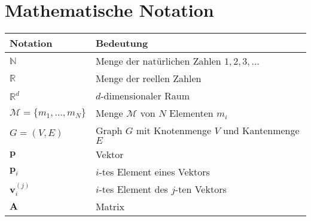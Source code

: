 
\chapter*{Mathematische Notation} \label{Notation}

\newcommand{\tabdummy}{\midrule[0pt]}

\begin{tabular}{p{}p{}}
  \textbf{Notation} & \textbf{Bedeutung} \\ \toprule[1pt]
   $\mathbb{N}$ & Menge der natürlichen Zahlen ${1, 2, 3, \ldots}$ \\ \tabdummy
   $\mathbb{R}$ & Menge der reellen Zahlen \\ \tabdummy
   $\mathbb{R}^d$ & $d$-dimensionaler Raum\\ \tabdummy
   $\mathcal{M} = \{m_1,\ldots,m_N\}$ & Menge $\mathcal{M}$ von $N$ Elementen $m_i$ \\ \tabdummy
   $G=(V,E)$ & Graph $G$ mit Knotenmenge $V$ und Kantenmenge $E$ \\ \tabdummy
   $\mathbf{p}$ & Vektor\\ \tabdummy
   $\mathbf{p}_i$ & $i$-tes Element eines Vektors \\ \tabdummy
   $\mathbf{v}^{(j)}_i$ & $i$-tes Element des $j$-ten Vektors \\ \tabdummy
   $\mathbf{A}$ & Matrix
\end{tabular}
